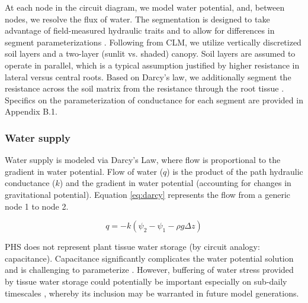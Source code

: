 \documentclass[draft,linenumbers]{agujournal}
\begin{document}
  At each node in the circuit diagram, we model water potential, and, between nodes, we resolve the flux of water.
  The segmentation is designed to take advantage of field-measured hydraulic traits and to allow for differences
  in segment parameterizations \citep{simonin2015, sperry2015}.
  Following from CLM, we utilize vertically discretized soil layers and a two-layer (sunlit vs. shaded) canopy.
  Soil layers are assumed to operate in parallel, which is a typical assumption justified by higher resistance in lateral versus central roots.
  Based on Darcy's law, we additionally segment the resistance across the soil matrix from the resistance through the root tissue \citep{williams1996}. 
  Specifics on the parameterization of conductance for each segment are provided in Appendix B.1.

    \subsubsection{Water supply}
    \label{sect:supply}
    Water supply is modeled via Darcy's Law, where flow is proportional to the gradient in water potential. 
    Flow of water ($q$) is the product of the path hydraulic conductance ($k$) and 
    the gradient in water potential (accounting for changes in gravitational potential). 
    Equation \ref{eq:darcy} represents the flow from a generic node 1 to node 2. 
    
     \begin{linenomath*}
     \begin{equation}
     \label{eq:darcy}
     q = -k\left(\psi_2 - \psi_1 - \rho g \Delta z\right)
     \end{equation}
     \end{linenomath*}
    
    PHS does not represent plant tissue water storage (by circuit analogy: capacitance). 
    Capacitance significantly complicates the water potential solution \citep{celia1990} and is challenging to parameterize \citep{bartlett2016}.   
     However, buffering of water stress provided by tissue water storage could potentially be important especially on sub-daily timescales \citep{meinzer2009,epila2017}, whereby its inclusion may be warranted in future model generations.
\end{document}
